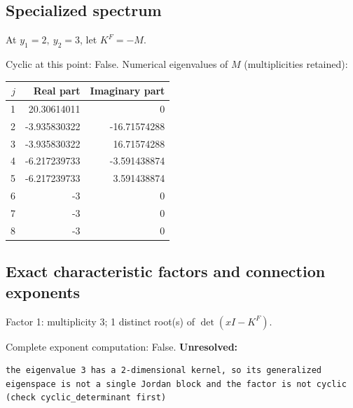 \documentclass[10pt,a4paper]{article}
\newcommand{\fitmath}[1]{\sbox{\mathbox}{$\displaystyle #1$}\ifdim\wd\mathbox>\linewidth\resizebox{\linewidth}{!}{\usebox{\mathbox}}\else\usebox{\mathbox}\fi}
\begin{document}
\subsection*{Specialized spectrum}
At $y_1=2,\ y_2=3$, let $K^F=-M$.
\begin{center}\fitmath{\Delta=0}\end{center}
Cyclic at this point: False.
Numerical eigenvalues of $M$ (multiplicities retained):
\begin{center}\small\begin{tabular}{rrr}\toprule $j$ & Real part & Imaginary part\\\midrule
1 & 20.30614011 & 0\\
2 & -3.935830322 & -16.71574288\\
3 & -3.935830322 & 16.71574288\\
4 & -6.217239733 & -3.591438874\\
5 & -6.217239733 & 3.591438874\\
6 & -3 & 0\\
7 & -3 & 0\\
8 & -3 & 0\\
\bottomrule\end{tabular}\end{center}
\subsection*{Exact characteristic factors and connection exponents}
Factor 1: multiplicity 3; 1 distinct root(s) of $\det(xI-K^F)$.
\begin{center}\fitmath{\begin{aligned}p_{1}(x)&=x - 3\end{aligned}}\end{center}
Complete exponent computation: False.
\textbf{Unresolved:}

\begin{lstlisting}
the eigenvalue 3 has a 2-dimensional kernel, so its generalized eigenspace is not a single Jordan block and the factor is not cyclic (check cyclic_determinant first)
\end{lstlisting}
\end{document}
